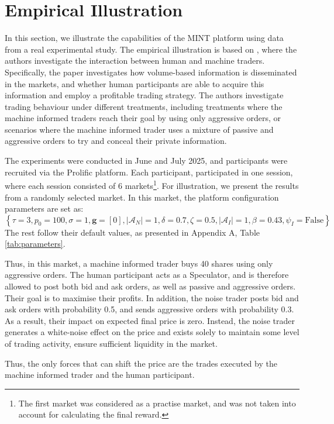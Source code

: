 \section{Empirical Illustration}
In this section, we illustrate the capabilities of the MINT platform using data from a real experimental study. The empirical illustration is based on \cite{feri2026}, where the authors investigate the interaction between human and machine traders. Specifically, the paper investigates how volume-based information is disseminated in the markets, and whether human participants are able to acquire this information and employ a profitable trading strategy. The authors investigate trading behaviour under different treatments, including treatments where the machine informed traders reach their goal by using only aggressive orders, or scenarios where the machine informed trader uses a mixture of passive and aggressive orders to try and conceal their private information.

The experiments were conducted in June and July 2025, and participants were recruited via the Prolific platform. Each participant, participated in one session, where each session consisted of 6 markets\footnote{The first market was considered as a practise market, and was not taken into account for calculating the final reward.}. For illustration, we present the results from a randomly selected market. In this market, the platform configuration parameters are set as:
\begin{equation*}
\left\{ \tau=3, p_{0} = 100, \sigma=1, \mathbf{g}=[0], |\mathcal{A}_{N}| = 1, \delta = 0.7, \zeta=0.5, |\mathcal{A}_{I}| =1, \beta=0.43, \psi_{I} = \text{False}\right\}
\end{equation*}
The rest follow their default values, as presented in Appendix A, Table \ref{tab:parameters}.

Thus, in this market, a machine informed trader buys 40 shares using only aggressive orders. The human participant acts as a Speculator, and is therefore allowed to post both bid and ask orders, as well as passive and aggressive orders. Their goal is to maximise their profits. In addition, the noise trader posts bid and ask orders with probability 0.5, and sends aggressive orders with probability 0.3. As a result, their impact on expected final price is zero. Instead, the noise trader generates a white-noise effect on the price and exists solely to maintain some level of trading activity, ensure sufficient liquidity in the market.

Thus, the only forces that can shift the price are the trades executed by the machine informed trader and the human participant.
